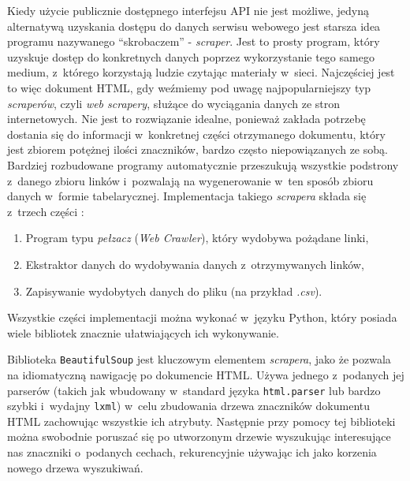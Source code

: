 Kiedy użycie publicznie dostępnego interfejsu API nie jest możliwe, jedyną alternatywą uzyskania dostępu do danych serwisu webowego jest starsza idea programu nazywanego ``skrobaczem'' - \emph{scraper}.
Jest to prosty program, który uzyskuje dostęp do konkretnych danych poprzez wykorzystanie tego samego medium, z~którego korzystają ludzie czytając materiały w~sieci.
Najczęściej jest to więc dokument HTML, gdy weźmiemy pod uwagę najpopularniejszy typ \emph{scraperów}, czyli \emph{web scrapery}, służące do wyciągania danych ze stron internetowych.
Nie jest to rozwiązanie idealne, ponieważ zakłada potrzebę dostania się do informacji w~konkretnej części otrzymanego dokumentu, który jest zbiorem potężnej ilości znaczników, bardzo często niepowiązanych ze sobą.
Bardziej rozbudowane programy automatycznie przeszukują wszystkie podstrony z~danego zbioru linków i~pozwalają na wygenerowanie w~ten sposób zbioru danych w~formie tabelarycznej.
Implementacja takiego \emph{scrapera} składa się z~trzech części \cite{mahto2016dive}:
\begin{enumerate}
	\item Program typu \emph{pełzacz} (\emph{Web Crawler}), który wydobywa pożądane linki,
	\item Ekstraktor danych do wydobywania danych z~otrzymywanych linków,
	\item Zapisywanie wydobytych danych do pliku (na przykład \emph{.csv}).
\end{enumerate}
Wszystkie części implementacji można wykonać w~języku Python, który posiada wiele bibliotek znacznie ułatwiających ich wykonywanie.

Biblioteka \texttt{BeautifulSoup} jest kluczowym elementem \emph{scrapera}, jako że pozwala na idiomatyczną nawigację po dokumencie HTML.
Używa jednego z~podanych jej parserów (takich jak wbudowany w~standard języka \texttt{html.parser} lub bardzo szybki i~wydajny \texttt{lxml}) w~celu zbudowania drzewa znaczników dokumentu HTML zachowując wszystkie ich atrybuty.
Następnie przy pomocy tej biblioteki można swobodnie poruszać się po utworzonym drzewie wyszukując interesujące nas znaczniki o~podanych cechach, rekurencyjnie używając ich jako korzenia nowego drzewa wyszukiwań.

